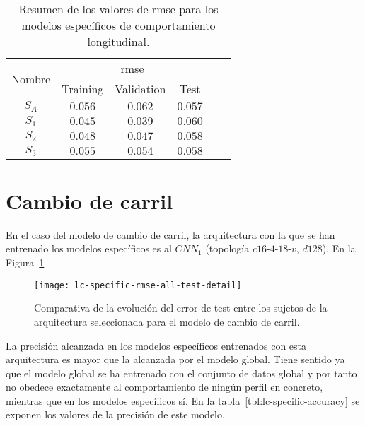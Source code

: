 \begin{table}
	\centering
	\caption[Resumen de los valores de \ac{rmse} para los modelos específicos de comportamiento longitudinal]{Resumen de los valores de \ac{rmse} para los modelos específicos de comportamiento longitudinal.}
	\label{tbl:lm-specific-rmse}
	\begin{tabular}{cccccc}
		\hline
		\multirow{2}{*}{Nombre} & \multicolumn{3}{c}{\ac{rmse}}      \\ 
		& Training & Validation & Test \\ \hline
		$S_A$ & $0.056$ & $0.062$ & $0.057$  \\
		$S_1$ & $0.045$ & $0.039$ & $0.060$  \\
		$S_2$ & $0.048$ & $0.047$ & $0.058$  \\
		$S_3$ & $0.055$ & $0.054$ & $0.058$  \\ \hline
	\end{tabular}
\end{table}

\section{Cambio de carril}

En el caso del modelo de cambio de carril, la arquitectura con la que se han entrenado los modelos específicos es al $CNN_1$ (topología $c16$-$4$-$18$-$v$, $d128$). En la Figura~\ref{fig:lc-specific-rmse-all-test-detail} 

\begin{figure}
	\centering
	\texttt{[image: lc-specific-rmse-all-test-detail]}
	\caption[Comparativa de la evolución del error de test entre los sujetos de la arquitectura seleccionada para el modelo de cambio de carril]{Comparativa de la evolución del error de test entre los sujetos de la arquitectura seleccionada para el modelo de cambio de carril.}
	\label{fig:lc-specific-rmse-all-test-detail}
\end{figure}

La precisión alcanzada en los modelos específicos entrenados con esta arquitectura es mayor que la alcanzada por el modelo global. Tiene sentido ya que el modelo global se ha entrenado con el conjunto de datos global y por tanto no obedece exactamente al comportamiento de ningún perfil en concreto, mientras que en los modelos específicos sí. En la tabla~\ref{tbl:lc-specific-accuracy} se exponen los valores de la precisión de este modelo.

